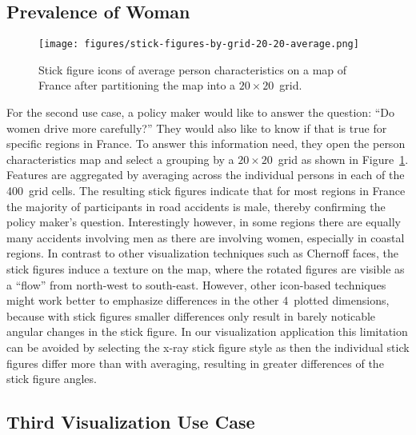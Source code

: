 \subsection{Prevalence of Woman}
\begin{figure}
    \centering
    \texttt{[image: figures/stick-figures-by-grid-20-20-average.png]}
    \caption{Stick figure icons of average person characteristics on a map of France after partitioning the map into a \(20 \times 20\)~grid.}
    \label{figure-stick-figures-grid-average}
\end{figure}
For the second use case, a policy maker would like to answer the question: \enquote{Do women drive more carefully?} They would also like to know if that is true for specific regions in France.
To answer this information need, they open the person characteristics map and select a grouping by a \(20 \times 20\)~grid as shown in Figure~\ref{figure-stick-figures-grid-average}.
Features are aggregated by averaging across the individual persons in each of the 400~grid cells. The resulting stick figures indicate that for most regions in France the majority of participants in road accidents is male, thereby confirming the policy maker's question.
Interestingly however, in some regions there are equally many accidents involving men as there are involving women, especially in coastal regions.
In contrast to other visualization techniques such as Chernoff faces, the stick figures induce a texture on the map, where the rotated figures are visible as a \enquote{flow} from north-west to south-east.
However, other icon-based techniques might work better to emphasize differences in the other 4~plotted dimensions, because with stick figures smaller differences only result in barely noticable angular changes in the stick figure.
In our visualization application this limitation can be avoided by selecting the x-ray stick figure style as then the individual stick figures differ more than with averaging, resulting in greater differences of the stick figure angles.

\subsection{Third Visualization Use Case}
